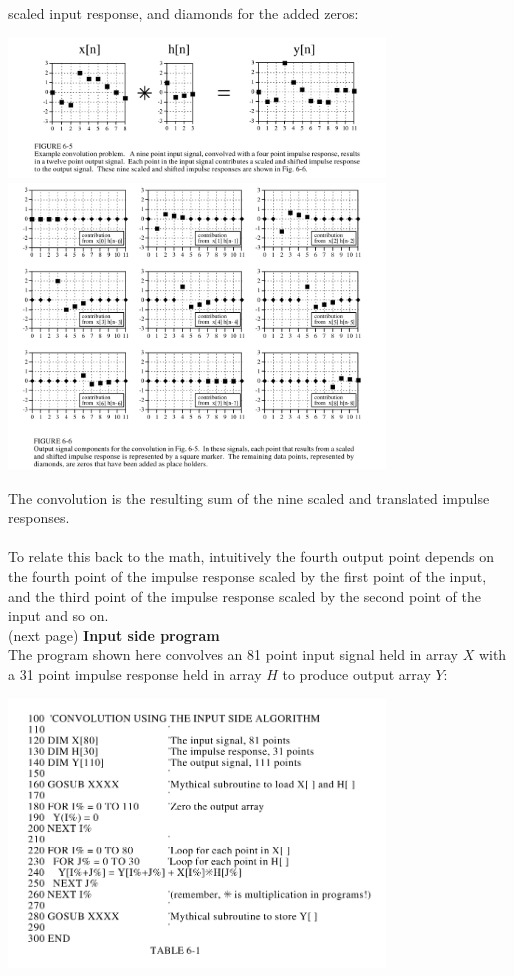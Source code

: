 \documentclass{report}
\begin{document}
scaled input response, and diamonds for the added zeros:
\begin{center}
\includegraphics[width=10cm]{a1}\\
\includegraphics[width=10cm]{a2}\\
\end{center}
The convolution is the resulting sum of the nine scaled and translated impulse responses.\\
\vspace{1mm}\\
To relate this back to the math, intuitively the fourth output point depends on the fourth point of the 
impulse response scaled by the first point of the input, and the third point of the impulse response scaled by 
the second point of the input and so on.\\
(next page)\newpage
\noindent\textbf{Input side program}\\
The program shown here convolves an 81 point input signal held in array $X$ with a 31 point impulse 
response held in array $H$ to produce output array $Y$:
\begin{center}
\includegraphics[width=10cm]{a3}\\
\end{center}
\end{document}
